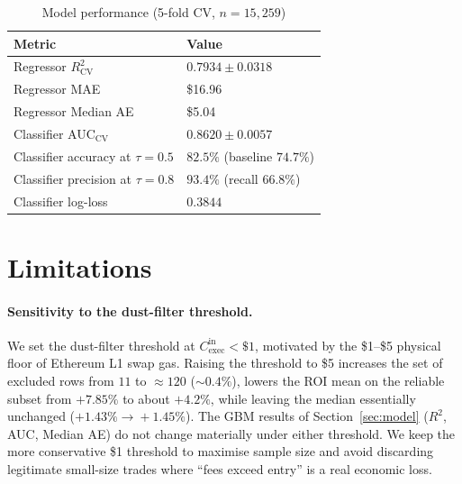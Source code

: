 \documentclass[sigconf,nonacm,10pt]{acmart}
\newcommand{\Cexec}{C_{\text{exec}}}
\begin{document}
\begin{table}[h]
  \centering
  \small
  \caption{Model performance (5-fold CV, $n=15{,}259$)}
  \label{tab:model}
  \begin{tabular}{ll}
    \toprule
    \textbf{Metric} & \textbf{Value} \\
    \midrule
    Regressor $R^2_{\text{CV}}$              & $0.7934 \pm 0.0318$ \\
    Regressor MAE                            & \$16.96 \\
    Regressor Median AE                      & \$5.04 \\
    Classifier AUC$_{\text{CV}}$             & $0.8620 \pm 0.0057$ \\
    Classifier accuracy at $\tau=0.5$        & $82.5\%$ (baseline $74.7\%$) \\
    Classifier precision at $\tau=0.8$       & $93.4\%$ (recall $66.8\%$) \\
    Classifier log-loss                      & $0.3844$ \\
    \bottomrule
  \end{tabular}
\end{table}

\section{Limitations}
\label{sec:limitations}

\paragraph{Sensitivity to the dust-filter threshold.} We set the
dust-filter threshold at $\Cexec^{\text{in}}<\$1$, motivated by the
\$1--\$5 physical floor of Ethereum L1 swap gas. Raising the
threshold to \$5 increases the set of excluded rows from $11$ to
$\approx 120$ ($\sim 0.4\%$), lowers the ROI mean on the reliable
subset from $+7.85\%$ to about $+4.2\%$, while leaving the median
essentially unchanged ($+1.43\%\!\to\!+1.45\%$). The GBM results of
Section~\ref{sec:model} ($R^2$, AUC, Median AE) do not
change materially under either threshold. We keep the more
conservative \$1 threshold to maximise sample size and avoid
discarding legitimate small-size trades where ``fees exceed
entry'' is a real economic loss.
\end{document}
